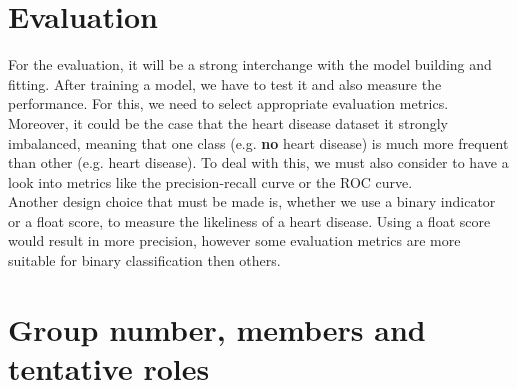 \documentclass{article}
\begin{document}
\section{Evaluation}

For the evaluation, it will be a strong interchange with the model building and fitting. After training a model, we have to test it and also measure the performance. For this, we need to select appropriate evaluation metrics. Moreover, it could be the case that the heart disease dataset it strongly imbalanced, meaning that one class (e.g. \textbf{no} heart disease) is much more frequent than other (e.g. heart disease). To deal with this, we must also consider to have a look into metrics like the precision-recall curve or the ROC curve.\\
Another design choice that must be made is, whether we use a binary indicator or a float score, to measure the likeliness of a heart disease. Using a float score would result in more precision, however some evaluation metrics are more suitable for binary classification then others.

\section{Group number, members and tentative roles}
\end{document}
